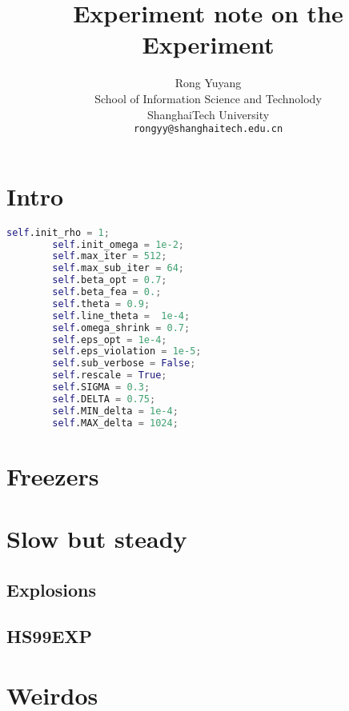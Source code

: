 \documentclass[10pt]{article}
\begin{document}
\title{
	Experiment note on the Experiment
}
\author{Rong Yuyang \\
School of Information Science and Technolody\\
ShanghaiTech University\\
{\tt\small rongyy@shanghaitech.edu.cn}
}
\maketitle

\section{Intro}

\begin{lstlisting}[language = python]
        self.init_rho = 1;
        self.init_omega = 1e-2;
        self.max_iter = 512;
        self.max_sub_iter = 64;
        self.beta_opt = 0.7;
        self.beta_fea = 0.;
        self.theta = 0.9;
        self.line_theta =  1e-4;
        self.omega_shrink = 0.7;
        self.eps_opt = 1e-4;
        self.eps_violation = 1e-5;
        self.sub_verbose = False;
        self.rescale = True;
        self.SIGMA = 0.3;
        self.DELTA = 0.75;
        self.MIN_delta = 1e-4;
        self.MAX_delta = 1024;
\end{lstlisting}
\section{Freezers}

\section{Slow but steady}
	\subsection{Explosions}

	\subsection{HS99EXP}

\section{Weirdos}
\end{document}
